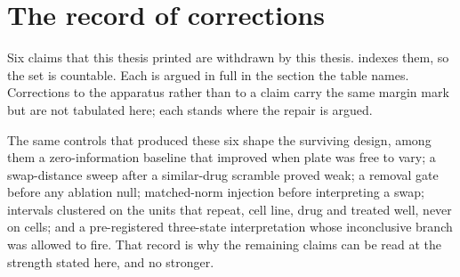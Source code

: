 \section*{The record of corrections}

\noindent
Six claims that this thesis printed are withdrawn by this thesis.
 indexes them, so the set is countable. Each is argued in
full in the section the table names. Corrections to the apparatus rather than to
a claim carry the same margin mark but are not tabulated here; each stands where
the repair is argued.

The same controls that produced these six shape the surviving design, among
them a zero-information baseline that improved when plate was free to vary; a
swap-distance sweep after a similar-drug scramble proved weak; a removal gate
before any ablation null; matched-norm injection before interpreting a swap;
intervals clustered on the units that repeat, cell line, drug and treated well,
never on cells; and a pre-registered three-state
interpretation whose inconclusive branch was allowed to fire. That record is why
the remaining claims can be read at the strength stated here, and no stronger.


